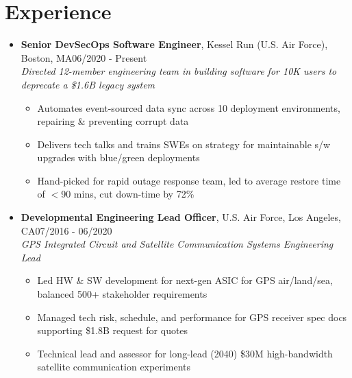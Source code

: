 \documentclass{article}
\begin{document}

\section{Experience} 
\begin{itemize}
    \itemsep0.2em
    \item \textbf{Senior DevSecOps Software Engineer}, Kessel Run (U.S. Air Force), Boston, MA\hfill 06/2020 - Present \\ \emph{Directed 12-member engineering team in building software for 10K users to deprecate a \$1.6B legacy system}
    \vspace{-\topsep} \vspace{0.2em}
    \begin{itemize}
        \itemsep0em
        \item Automates event-sourced data sync across 10 deployment environments, repairing \& preventing corrupt data
        \item Delivers tech talks and trains SWEs on strategy for maintainable s/w upgrades with blue/green deployments
        \item Hand-picked for rapid outage response team, led to average restore time of $<$90 mins, cut down-time by 72\%
    \end{itemize}
    
    \item \textbf{Developmental Engineering Lead Officer}, U.S. Air Force, Los Angeles, CA\hfill 07/2016 - 06/2020 \\ \emph{GPS Integrated Circuit and Satellite Communication Systems Engineering Lead}
    \vspace{-\topsep} \vspace{0.2em}
    \begin{itemize}
        \itemsep0em
        \item Led HW \& SW development for next-gen ASIC for GPS air/land/sea, balanced 500+ stakeholder requirements
        \item Managed tech risk, schedule, and performance for GPS receiver spec docs supporting \$1.8B request for quotes
        \item Technical lead and assessor for long-lead (2040) \$30M high-bandwidth satellite communication experiments
    \end{itemize}
    

\end{itemize}
\end{document}
